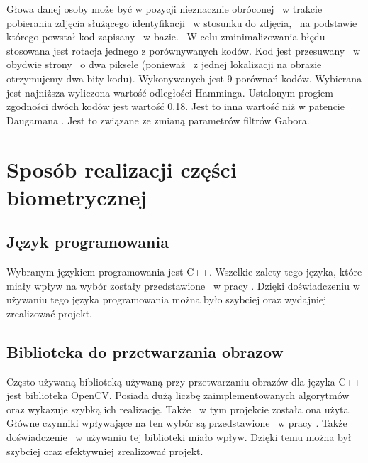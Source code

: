 Głowa danej osoby może być w pozycji nieznacznie obróconej ~w trakcie pobierania zdjęcia służącego identyfikacji ~w stosunku do zdjęcia, ~na podstawie  którego powstał kod zapisany  ~w bazie. ~W celu zminimalizowania błędu stosowana jest rotacja jednego z porównywanych kodów. Kod jest przesuwany ~w obydwie strony ~o dwa piksele (ponieważ ~z jednej lokalizacji na obrazie otrzymujemy dwa bity kodu). Wykonywanych jest 9 porównań kodów. Wybierana jest najniższa wyliczona wartość odległości Hamminga. Ustalonym progiem zgodności dwóch kodów jest wartość 0.18. Jest to inna wartość niż w patencie Daugamana \cite{Daugman}. Jest to związane ze zmianą parametrów filtrów Gabora.

\section{Sposób realizacji części biometrycznej}
\label{subsec:realizacjaBio}

\subsection{Język programowania}
\label{sec:jezykProgramowania}
Wybranym językiem programowania jest C++. Wszelkie zalety tego języka, które miały wpływ na wybór zostały przedstawione ~w pracy \cite{Gl11}. Dzięki doświadczeniu w używaniu tego języka programowania można było szybciej oraz wydajniej zrealizować projekt.

\subsection{Biblioteka do przetwarzania obrazow}
\label{sec:bibliotekaObrazow}
Często używaną biblioteką używaną przy przetwarzaniu obrazów dla języka C++ jest biblioteka OpenCV. Posiada dużą liczbę zaimplementowanych algorytmów oraz wykazuje szybką ich realizację. Także ~w tym projekcie została ona użyta. Główne czynniki wpływające na ten wybór są przedstawione ~w pracy \cite{Gl11}. Także doświadczenie ~w używaniu tej biblioteki miało wpływ. Dzięki temu można był szybciej oraz efektywniej zrealizować projekt.


